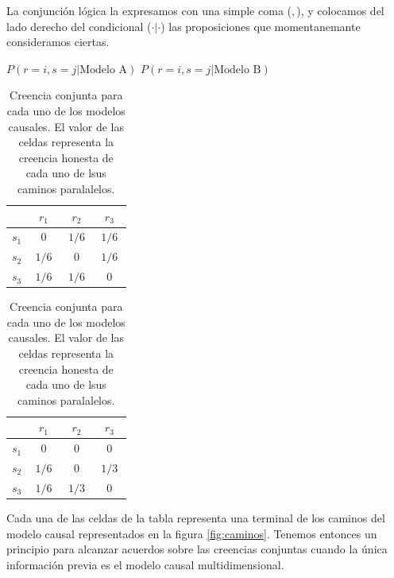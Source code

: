\documentclass[a4paper,10pt]{book}
\theoremstyle{definition}
\begin{document}
%
La conjunción lógica la expresamos con una simple coma ($,$), y colocamos del lado derecho del condicional ($\cdot|\cdot$) las proposiciones que momentanemante consideramos ciertas.
%
\begin{table}[H]
\centering
$P(r=i, s=j | \text{Modelo A})$ \hspace{1.8cm} $P(r=i, s=j | \text{Modelo B})$ \\[0.1cm]
 \begin{tabular}{|c|c|c|c|} \hline \setlength\tabcolsep{0.4cm}
       & \, $r_1$ \, &  \, $r_2$ \, & \, $r_3$ \, \\ \hline 
  $s_1$ & $0$ & $1/6$ & $1/6$  \\ \hline
  $s_2$ & $1/6$ & $0$ & $1/6$  \\ \hline
  $s_3$ & $1/6$ & $1/6$ & $0$ \\ \hline 
  \end{tabular}
  \hspace{1.5cm}
  \begin{tabular}{|c|c|c|c|} \hline  \setlength\tabcolsep{0.4cm} 
 & \, $r_1$ \, &  \, $r_2$ \, & \, $r_3$ \,  \\ \hline 
  $s_1$ & $0$ & $0$ & $0$ \\ \hline
  $s_2$ & $1/6$ & $0$ & $1/3$ \\ \hline
  $s_3$ & $1/6$ & $1/3$ & $0$  \\ \hline  
  \end{tabular}
  \caption{Creencia conjunta para cada uno de los modelos causales. El valor de las celdas representa la creencia honesta de cada uno de lsus caminos paralalelos. }
  \label{tab:creencia_conjunta}
\end{table}
%
Cada una de las celdas de la tabla representa una terminal de los caminos del modelo causal representados en la figura \ref{fig:caminos}.
Tenemos entonces un principio para alcanzar acuerdos sobre las creencias conjuntas cuando la única información previa es el modelo causal multidimensional.
\end{document}
